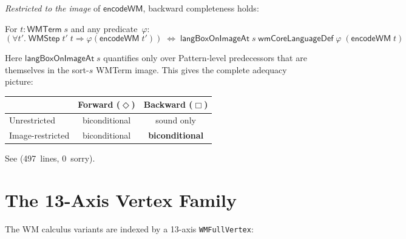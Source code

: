 \documentclass[11pt,openany]{report}
\begin{document}
\emph{Restricted to the image} of $\mathsf{encodeWM}$, backward
completeness holds:

\begin{theorem}
\label{thm:box-image}
For $t : \mathsf{WMTerm}\;s$ and any predicate~$\varphi$:
\[
(\forall t'.\; \mathsf{WMStep}\;t'\;t \Rightarrow \varphi(\mathsf{encodeWM}\;t'))
\;\Leftrightarrow\;
\mathsf{langBoxOnImageAt}\;s\;\mathsf{wmCoreLanguageDef}\;\varphi\;
(\mathsf{encodeWM}\;t)
\]
\end{theorem}

\noindent
Here $\mathsf{langBoxOnImageAt}\;s$ quantifies only over Pattern-level
predecessors that are themselves in the sort-$s$ WMTerm image.  This gives
the complete adequacy picture:
\begin{center}
\begin{tabular}{lcc}
\toprule
& Forward ($\Diamond$) & Backward ($\Box$) \\
\midrule
Unrestricted & biconditional & sound only \\
Image-restricted & biconditional & \textbf{biconditional} \\
\bottomrule
\end{tabular}
\end{center}

\noindent
See 
(497~lines, 0~sorry).

\section{The 13-Axis Vertex Family}
\label{sec:wm-vertex-family}
\label{sec:wm-13axis}

The WM calculus variants are indexed by a 13-axis \texttt{WMFullVertex}:
\end{document}
